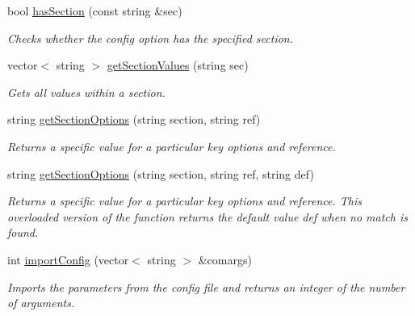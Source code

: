\begin{DoxyCompactItemize}
bool \hyperlink{class_config_parser_ac07a482562b15426d09da118d159514a}{has\+Section} (const string \&sec)
\begin{DoxyCompactList}\small\item\em Checks whether the config option has the specified section. \end{DoxyCompactList}\item 
vector$<$ string $>$ \hyperlink{class_config_parser_aada1ad61b1f9a10b1d4fd8ab8d757e2d}{get\+Section\+Values} (string sec)
\begin{DoxyCompactList}\small\item\em Gets all values within a section. \end{DoxyCompactList}\item 
string \hyperlink{class_config_parser_ab50661dd2253598a0a537239c925e659}{get\+Section\+Options} (string section, string ref)
\begin{DoxyCompactList}\small\item\em Returns a specific value for a particular key options and reference. \end{DoxyCompactList}\item 
string \hyperlink{class_config_parser_a964279dd7fd321c58577766871c329f4}{get\+Section\+Options} (string section, string ref, string def)
\begin{DoxyCompactList}\small\item\em Returns a specific value for a particular key options and reference. This overloaded version of the function returns the default value def when no match is found. \end{DoxyCompactList}\item 
int \hyperlink{class_config_parser_a56a209c1823fbe742fdea6f99112c41f}{import\+Config} (vector$<$ string $>$ \&comargs)
\begin{DoxyCompactList}\small\item\em Imports the parameters from the config file and returns an integer of the number of arguments. \end{DoxyCompactList}\end{DoxyCompactItemize}
